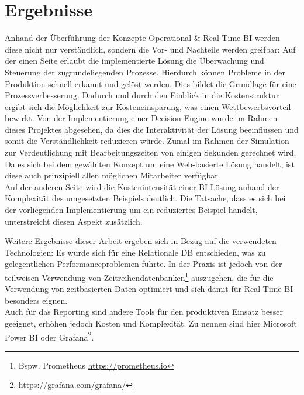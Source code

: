 \section{Ergebnisse}
Anhand der Überführung der Konzepte Operational \& Real-Time \ac{BI} werden diese nicht nur verständlich, sondern die Vor- und Nachteile werden greifbar: Auf der einen Seite erlaubt die implementierte Lösung die Überwachung und Steuerung der zugrundeliegenden Prozesse. Hierdurch können Probleme in der Produktion schnell erkannt und gelöst werden. Dies bildet die Grundlage für eine Prozessverbesserung. Dadurch und durch den Einblick in die Kostenstruktur ergibt sich die Möglichkeit zur Kosteneinsparung, was einen Wettbewerbsvorteil bewirkt. Von der Implementierung einer Decision-Engine wurde im Rahmen dieses Projektes abgesehen, da dies die Interaktivität der Lösung beeinflussen und somit die Verständlichkeit reduzieren würde. Zumal im Rahmen der Simulation zur Verdeutlichung mit Bearbeitungszeiten von einigen Sekunden gerechnet wird. Da es sich bei dem gewählten Konzept um eine Web-basierte Lösung handelt, ist diese auch prinzipiell allen möglichen Mitarbeiter verfügbar. 
\\Auf der anderen Seite wird die Kostenintensität einer \ac{BI}-Lösung anhand der Komplexität des umgesetzten Beispiels deutlich. Die Tatsache, dass es sich bei der vorliegenden Implementierung um ein reduziertes Beispiel handelt, unterstreicht diesen Aspekt zusätzlich.

Weitere Ergebnisse dieser Arbeit ergeben sich in Bezug auf die verwendeten Technologien: Es wurde sich für eine Relationale \ac{DB} entschieden, was zu gelegentlichen Performanceproblemen führte. In der Praxis ist jedoch von der teilweisen Verwendung von Zeitreihendatenbanken\footnote{Bspw. Prometheus \url{https://prometheus.io}} auszugehen, die für die Verwendung von zeitbasierten Daten optimiert und sich damit für Real-Time \ac{BI} besonders eignen.
\\Auch für das Reporting sind andere Tools für den produktiven Einsatz besser geeignet, erhöhen jedoch Kosten und Komplexität. Zu nennen sind hier Microsoft Power BI oder Grafana\footnote{\url{https://grafana.com/grafana/}}.